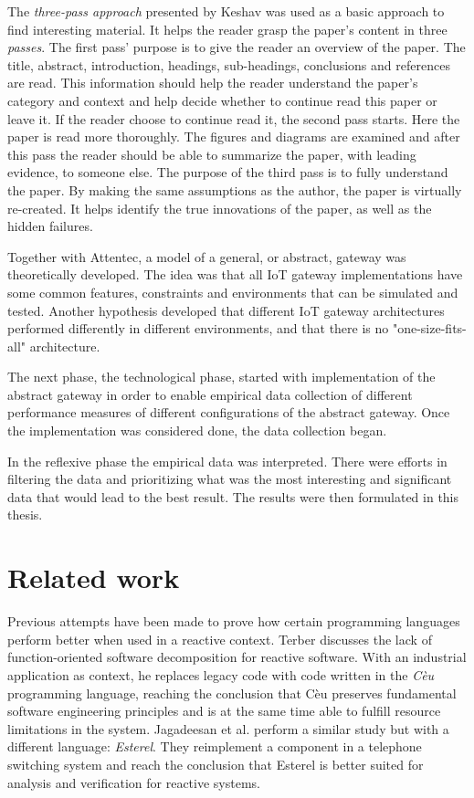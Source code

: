 The \textit{three-pass approach} presented by Keshav \cite{keshav2007read} was
used as a basic approach to find interesting material. It helps the reader
grasp the paper's content in three \textit{passes}. The first pass' purpose is
to give the reader an overview of the paper. The title, abstract, introduction,
headings, sub-headings, conclusions and references are read. This information
should help the reader understand the paper's category and context and help
decide whether to continue read this paper or leave it. If the reader choose to
continue read it, the second pass starts. Here the paper is read more
thoroughly. The figures and diagrams are examined and after this pass the
reader should be able to summarize the paper, with leading evidence, to someone
else. The purpose of the third pass is to fully understand the paper. By making
the same assumptions as the author, the paper is virtually re-created. It helps
identify the true innovations of the paper, as well as the hidden failures.

Together with Attentec, a model of a general, or abstract, gateway was
theoretically developed. The idea was that all IoT gateway implementations have
some common features, constraints and environments that can be simulated and
tested. Another hypothesis developed that different IoT gateway architectures
performed differently in different environments, and that there is no
"one-size-fits-all" architecture.

The next phase, the technological phase, started with implementation of the
abstract gateway in order to enable empirical data collection of different
performance measures of different configurations of the abstract gateway. Once
the implementation was considered done, the data collection began.

In the reflexive phase the empirical data was interpreted. There were efforts
in filtering the data and prioritizing what was the most interesting and
significant data that would lead to the best result. The results were then
formulated in this thesis.

\section{Related work}

Previous attempts have been made to prove how certain programming languages
perform better when used in a reactive context. Terber
\cite{terber2017function} discusses the lack of function-oriented software
decomposition for reactive software. With an industrial application as context,
he replaces legacy code with code written in the \textit{Cèu} programming
language, reaching the conclusion that Cèu preserves fundamental software
engineering principles and is at the same time able to fulfill resource
limitations in the system. Jagadeesan et al. \cite{jagadeesan1996formal}
perform a similar study but with a different language: \textit{Esterel}. They
reimplement a component in a telephone switching system and reach the
conclusion that Esterel is better suited for analysis and verification for
reactive systems.

